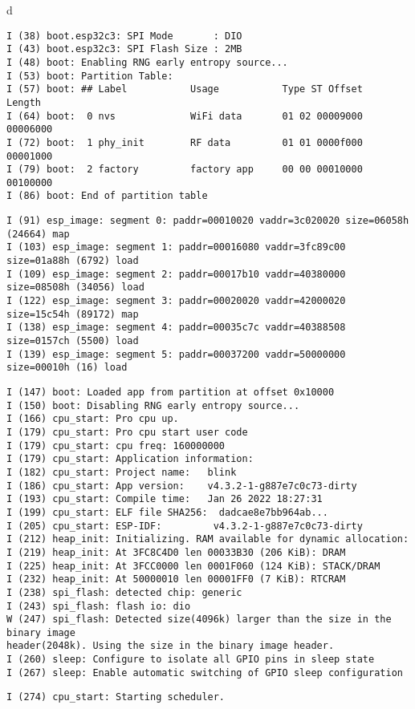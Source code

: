 \documentclass[a4paper,12pt]{book}
\begin{document}
\begin{codebloc}
\begin{tabular}{d}
\vspace{2pt}
\begin{verbatim}
I (38) boot.esp32c3: SPI Mode       : DIO
I (43) boot.esp32c3: SPI Flash Size : 2MB
I (48) boot: Enabling RNG early entropy source...
I (53) boot: Partition Table:
I (57) boot: ## Label           Usage           Type ST Offset   Length
I (64) boot:  0 nvs             WiFi data       01 02 00009000 00006000
I (72) boot:  1 phy_init        RF data         01 01 0000f000 00001000
I (79) boot:  2 factory         factory app     00 00 00010000 00100000
I (86) boot: End of partition table
\end{verbatim}
\fontsize{9.5pt}{10pt}\selectfont
\begin{verbatim}
I (91) esp_image: segment 0: paddr=00010020 vaddr=3c020020 size=06058h (24664) map
I (103) esp_image: segment 1: paddr=00016080 vaddr=3fc89c00 size=01a88h (6792) load
I (109) esp_image: segment 2: paddr=00017b10 vaddr=40380000 size=08508h (34056) load
I (122) esp_image: segment 3: paddr=00020020 vaddr=42000020 size=15c54h (89172) map
I (138) esp_image: segment 4: paddr=00035c7c vaddr=40388508 size=0157ch (5500) load
I (139) esp_image: segment 5: paddr=00037200 vaddr=50000000 size=00010h (16) load
\end{verbatim}
\footnotesize
\begin{verbatim}
I (147) boot: Loaded app from partition at offset 0x10000
I (150) boot: Disabling RNG early entropy source...
I (166) cpu_start: Pro cpu up.
I (179) cpu_start: Pro cpu start user code
I (179) cpu_start: cpu freq: 160000000
I (179) cpu_start: Application information:
I (182) cpu_start: Project name:   blink
I (186) cpu_start: App version:    v4.3.2-1-g887e7c0c73-dirty
I (193) cpu_start: Compile time:   Jan 26 2022 18:27:31
I (199) cpu_start: ELF file SHA256:  dadcae8e7bb964ab...
I (205) cpu_start: ESP-IDF:         v4.3.2-1-g887e7c0c73-dirty
I (212) heap_init: Initializing. RAM available for dynamic allocation:
I (219) heap_init: At 3FC8C4D0 len 00033B30 (206 KiB): DRAM
I (225) heap_init: At 3FCC0000 len 0001F060 (124 KiB): STACK/DRAM
I (232) heap_init: At 50000010 len 00001FF0 (7 KiB): RTCRAM
I (238) spi_flash: detected chip: generic
I (243) spi_flash: flash io: dio
W (247) spi_flash: Detected size(4096k) larger than the size in the binary image 
header(2048k). Using the size in the binary image header.
I (260) sleep: Configure to isolate all GPIO pins in sleep state
I (267) sleep: Enable automatic switching of GPIO sleep configuration
\end{verbatim}
\verb|I (274) cpu_start: Starting scheduler.|
\end{tabular}
\end{codebloc}
\end{document}
